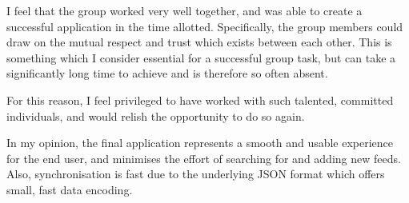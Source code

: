 \documentclass[a4paper,11pt]{article}
\begin{document}
    I feel that the group worked very well together, and was able to create
    a successful application in the time allotted. Specifically, the group
    members could draw on the mutual respect and trust which exists between
    each other. This is something which I consider essential for a successful
    group task, but can take a significantly long time to achieve and is
    therefore so often absent.

    For this reason, I feel privileged to have worked with such talented,
    committed individuals, and would relish the opportunity to do so again.

    In my opinion, the final application represents a smooth and usable
    experience for the end user, and minimises the effort of searching for and
    adding new feeds. Also, synchronisation is fast due to the underlying JSON
    format which offers small, fast data encoding.
\end{document}
